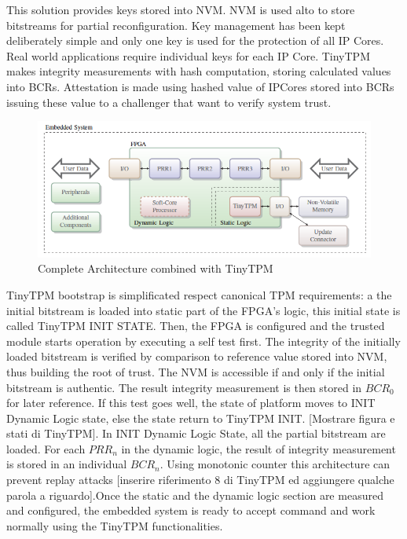 \documentclass[../tesi.tex]{subfiles}
\begin{document}
{This solution provides keys stored into NVM. NVM is used alto to store bitstreams for partial reconfiguration. Key management has been kept deliberately simple and only one key is used for the protection of all IP Cores. Real world applications require individual keys for each IP Core. TinyTPM makes integrity measurements with hash computation, storing calculated values into BCRs. Attestation is made using hashed value of IPCores stored into BCRs issuing these value to a challenger that want to verify system trust. \\
\begin{figure}
\centering
\includegraphics[scale=0.50]{images/tinyplatform.png}
\caption{Complete Architecture combined with TinyTPM}
\label{nome}
\end{figure}
TinyTPM bootstrap is simplificated respect canonical TPM requirements: a the initial bitstream is loaded into static part of the FPGA's logic, this initial state is called TinyTPM INIT STATE. Then, the FPGA is configured and the trusted module starts operation by executing a self test first. The integrity of the initially loaded bitstream is verified by comparison to reference value stored into NVM, thus building the root of trust. The NVM is accessible if and only if the initial bitstream is authentic. The result integrity measurement is then stored in $BCR_0$ for later reference. If this test goes well, the state of platform moves to INIT Dynamic Logic state, else the state return to TinyTPM INIT. [Mostrare figura e stati di TinyTPM]. In INIT Dynamic Logic State, all the partial bitstream are loaded. For each $PRR_n$ in the dynamic logic, the result of integrity measurement is stored in an individual $BCR_n$. Using monotonic counter this architecture can prevent replay attacks [inserire riferimento 8 di TinyTPM ed aggiungere qualche parola a riguardo].Once the static and the dynamic logic section are measured and configured, the embedded system is ready to accept command and work normally using the TinyTPM functionalities.  \\
}
\end{document}

